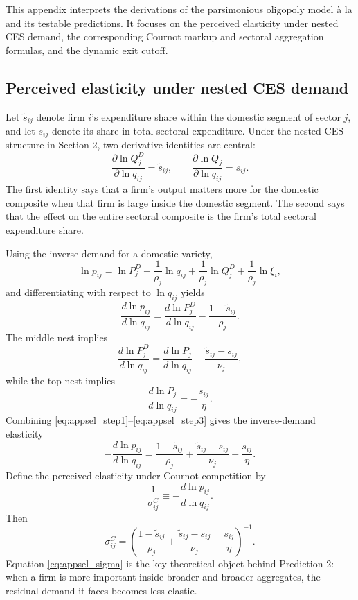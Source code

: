 This appendix interprets the derivations of the parsimonious oligopoly model à la \textcite{atkesonPricingtoMarketTradeCosts2008} and its testable predictions. It focuses on the perceived elasticity under nested CES demand, the corresponding Cournot markup and sectoral aggregation formulas, and the dynamic exit cutoff.

\subsection{Perceived elasticity under nested CES demand}

Let $\tilde{s}_{ij}$ denote firm $i$'s expenditure share within the domestic segment of sector $j$, and let $s_{ij}$ denote its share in total sectoral expenditure. Under the nested CES structure in Section 2, two derivative identities are central:
\begin{equation}
\frac{\partial \ln Q_j^D}{\partial \ln q_{ij}} = \tilde{s}_{ij},
\qquad
\frac{\partial \ln Q_j}{\partial \ln q_{ij}} = s_{ij}.
\label{eq:appsel_quantity_links}
\end{equation}
The first identity says that a firm's output matters more for the domestic composite when that firm is large inside the domestic segment. The second says that the effect on the entire sectoral composite is the firm's total sectoral expenditure share.

Using the inverse demand for a domestic variety,
\[
\ln p_{ij}
=
\ln P_j^D
- \frac{1}{\rho_j}\ln q_{ij}
+ \frac{1}{\rho_j}\ln Q_j^D
+ \frac{1}{\rho_j}\ln \xi_i,
\]
and differentiating with respect to $\ln q_{ij}$ yields
\begin{equation}
\frac{d \ln p_{ij}}{d \ln q_{ij}}
=
\frac{d \ln P_j^D}{d \ln q_{ij}}
- \frac{1-\tilde{s}_{ij}}{\rho_j}.
\label{eq:appsel_step1}
\end{equation}
The middle nest implies
\begin{equation}
\frac{d \ln P_j^D}{d \ln q_{ij}}
=
\frac{d \ln P_j}{d \ln q_{ij}}
- \frac{\tilde{s}_{ij}-s_{ij}}{\nu_j},
\label{eq:appsel_step2}
\end{equation}
while the top nest implies
\begin{equation}
\frac{d \ln P_j}{d \ln q_{ij}} = -\frac{s_{ij}}{\eta}.
\label{eq:appsel_step3}
\end{equation}
Combining \eqref{eq:appsel_step1}--\eqref{eq:appsel_step3} gives the inverse-demand elasticity
\begin{equation}
-\frac{d \ln p_{ij}}{d \ln q_{ij}}
=
\frac{1-\tilde{s}_{ij}}{\rho_j}
+
\frac{\tilde{s}_{ij}-s_{ij}}{\nu_j}
+
\frac{s_{ij}}{\eta}.
\label{eq:appsel_inv_elast}
\end{equation}
Define the perceived elasticity under Cournot competition by
\[
\frac{1}{\sigma_{ij}^C} \equiv -\frac{d \ln p_{ij}}{d \ln q_{ij}}.
\]
Then
\begin{equation}
\sigma_{ij}^C
=
\left(
\frac{1-\tilde{s}_{ij}}{\rho_j}
+
\frac{\tilde{s}_{ij}-s_{ij}}{\nu_j}
+
\frac{s_{ij}}{\eta}
\right)^{-1}.
\label{eq:appsel_sigma}
\end{equation}
Equation \eqref{eq:appsel_sigma} is the key theoretical object behind Prediction 2: when a firm is more important inside broader and broader aggregates, the residual demand it faces becomes less elastic.

